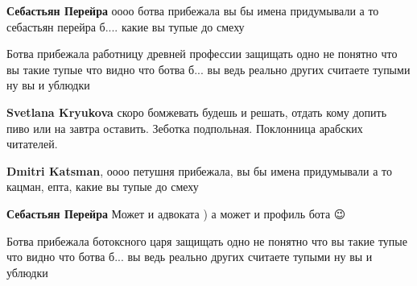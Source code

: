 \begin{itemize}
\begin{itemize}
\textbf{Себастьян Перейра} оооо ботва прибежала вы бы имена придумывали а то себастьян перейра б.... какие вы тупые до смеху

 
Ботва прибежала работницу древней профессии защищать одно не понятно что вы такие тупые что видно что ботва б... вы ведь реально других считаете тупыми ну вы и ублюдки

 
\textbf{Svetlana Kryukova} скоро бомжевать будешь и решать, отдать кому допить пиво или на завтра оставить. Зеботка подпольная. Поклонница арабских читателей.

 
\textbf{Dmitri Katsman}, оооо петушня прибежала, вы бы имена придумывали а то кацман, епта, какие вы тупые до смеху

 
\textbf{Себастьян Перейра} Может и адвоката ) а может и профиль бота 😉

 
Ботва прибежала ботоксного царя защищать одно не понятно что вы такие тупые что видно что ботва б... вы ведь реально других считаете тупыми ну вы и ублюдки

 

\end{itemize}
\end{itemize}
